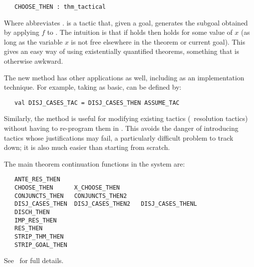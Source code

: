 \begin{holboxed}
\begin{verbatim}
   CHOOSE_THEN : thm_tactical
\end{verbatim}
\end{holboxed}

\noindent Where  abbreviates .
is a tactic that, given a goal, generates the subgoal
obtained
by applying $f$ to .
The intuition is that if
 holds then 
holds for some value of $x$ (as long as the
variable $x$ is not free elsewhere in the theorem or current goal).
This gives an easy way of using existentially quantified theorems, something that is otherwise awkward.

The new method has other applications as well, including as an
implementation technique.
For example,
taking  as basic, 
can be defined by:

\begin{hol}
\begin{verbatim}
   val DISJ_CASES_TAC = DISJ_CASES_THEN ASSUME_TAC
\end{verbatim}
\end{hol}

\noindent Similarly, the method is useful for modifying existing tactics (\eg\ resolution tactics) without having to re-program them in \ML.
This avoids the danger of introducing tactics whose justifications may fail,  a particularly difficult problem to track down; it is also much easier than starting from scratch.

The main theorem continuation functions in the system are:

\begin{hol}
\begin{verbatim}
   ANTE_RES_THEN
   CHOOSE_THEN      X_CHOOSE_THEN
   CONJUNCTS_THEN   CONJUNCTS_THEN2
   DISJ_CASES_THEN  DISJ_CASES_THEN2   DISJ_CASES_THENL
   DISCH_THEN
   IMP_RES_THEN
   RES_THEN
   STRIP_THM_THEN
   STRIP_GOAL_THEN
\end{verbatim}
\end{hol}

\noindent See \REFERENCE\ for full details.

